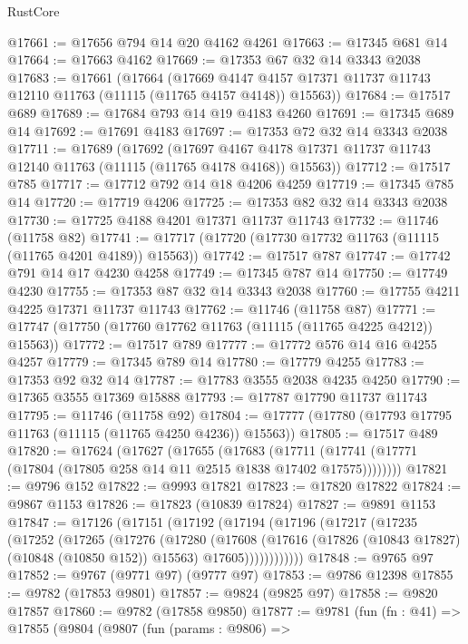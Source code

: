 \begin{lexlean}{RustCore}
\begin{coremodule}
@17661 := @17656 @794 @14 @20 @4162 @4261
@17663 := @17345 @681 @14
@17664 := @17663 @4162
@17669 := @17353 @67 @32 @14 @3343 @2038
@17683 := @17661
    (@17664
      (@17669 @4147 @4157 @17371 @11737 @11743 @12110 @11763 (@11115 (@11765 @4157 @4148)) @15563))
@17684 := @17517 @689
@17689 := @17684 @793 @14 @19 @4183 @4260
@17691 := @17345 @689 @14
@17692 := @17691 @4183
@17697 := @17353 @72 @32 @14 @3343 @2038
@17711 := @17689
    (@17692
      (@17697 @4167 @4178 @17371 @11737 @11743 @12140 @11763 (@11115 (@11765 @4178 @4168)) @15563))
@17712 := @17517 @785
@17717 := @17712 @792 @14 @18 @4206 @4259
@17719 := @17345 @785 @14
@17720 := @17719 @4206
@17725 := @17353 @82 @32 @14 @3343 @2038
@17730 := @17725 @4188 @4201 @17371 @11737 @11743
@17732 := @11746 (@11758 @82)
@17741 := @17717 (@17720 (@17730 @17732 @11763 (@11115 (@11765 @4201 @4189)) @15563))
@17742 := @17517 @787
@17747 := @17742 @791 @14 @17 @4230 @4258
@17749 := @17345 @787 @14
@17750 := @17749 @4230
@17755 := @17353 @87 @32 @14 @3343 @2038
@17760 := @17755 @4211 @4225 @17371 @11737 @11743
@17762 := @11746 (@11758 @87)
@17771 := @17747 (@17750 (@17760 @17762 @11763 (@11115 (@11765 @4225 @4212)) @15563))
@17772 := @17517 @789
@17777 := @17772 @576 @14 @16 @4255 @4257
@17779 := @17345 @789 @14
@17780 := @17779 @4255
@17783 := @17353 @92 @32 @14
@17787 := @17783 @3555 @2038 @4235 @4250
@17790 := @17365 @3555 @17369 @15888
@17793 := @17787 @17790 @11737 @11743
@17795 := @11746 (@11758 @92)
@17804 := @17777 (@17780 (@17793 @17795 @11763 (@11115 (@11765 @4250 @4236)) @15563))
@17805 := @17517 @489
@17820 := @17624
    (@17627
      (@17655
        (@17683
          (@17711 (@17741 (@17771 (@17804 (@17805 @258 @14 @11 @2515 @1838 @17402 @17575))))))))
@17821 := @9796 @152
@17822 := @9993 @17821
@17823 := @17820 @17822
@17824 := @9867 @1153
@17826 := @17823 (@10839 @17824)
@17827 := @9891 @1153
@17847 := @17126
    (@17151
      (@17192
        (@17194
          (@17196
            (@17217
              (@17235
                (@17252
                  (@17265
                    (@17276
                      (@17280
                        (@17608
                          (@17616
                            (@17826 (@10843 @17827) (@10848 (@10850 @152)) @15563)
                            @17605))))))))))))
@17848 := @9765 @97
@17852 := @9767 (@9771 @97) (@9777 @97)
@17853 := @9786 @12398
@17855 := @9782 (@17853 @9801)
@17857 := @9824 (@9825 @97)
@17858 := @9820 @17857
@17860 := @9782 (@17858 @9850)
@17877 := @9781
    (fun (fn : @41) =>
    @17855
      (@9804
        (@9807
          (fun (params : @9806) =>

\end{coremodule}
\end{lexlean}
